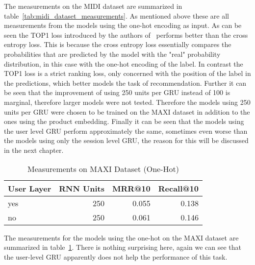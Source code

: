 The measurements on the MIDI dataset are summarized in table~\ref{tab:midi_dataset_measurements}.
As mentioned above these are all measurements from the models using the one-hot encoding as input.
As can be seen the TOP1 loss introduced by the authors of~\cite{gru4rec} performs better than the cross entropy loss.
This is because the cross entropy loss essentially compares the probabilities that are predicted by the model with the "real" probability distribution, in this case with the one-hot encoding of the label.
In contrast the TOP1 loss is a strict ranking loss, only concerned with the position of the label in the predictions, which better models the task of recommendation.
Further it can be seen that the improvement of using 250 units per GRU instead of 100 is marginal, therefore larger models were not tested.
Therefore the models using 250 units per GRU were chosen to be trained on the MAXI dataset in addition to the ones using the product embedding.
Finally it can be seen that the models using the user level GRU perform approximately the same, sometimes even worse than the models using only the session level GRU, the reason for this will be discussed in the next chapter.
\begin{table}[t]
    \centering
    \begin{tabular}{lrrr}\toprule
        \textbf{User Layer} & \textbf{RNN Units} & \textbf{MRR@10} & \textbf{Recall@10} \\ \midrule
        yes & 250 & 0.055 & 0.138 \\ 
        no & 250 & 0.061 & 0.146 \\ \bottomrule
    \end{tabular}
    \caption{Measurements on MAXI Dataset (One-Hot)}
    \label{tab:maxi_dataset_measurements_one_hot}
\end{table}
The measurements for the models using the one-hot on the MAXI dataset are summarized in table~\ref{tab:maxi_dataset_measurements_one_hot}.
There is nothing surprising here, again we can see that the user-level GRU apparently does not help the performance of this task.

